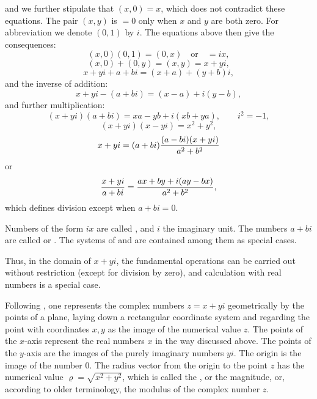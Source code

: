 \begingroup
\setlength{\abovedisplayskip}{5pt plus 2pt minus 1pt}
\setlength{\belowdisplayskip}{5pt plus 2pt minus 1pt}
\setlength{\abovedisplayshortskip}{3pt plus 1pt}
\setlength{\belowdisplayshortskip}{4pt plus 1pt}
and we further stipulate that $(x,0)=x$, which does not contradict
these equations. The pair $(x,y)$ is $=0$ only when $x$ and $y$
are both zero. For abbreviation we denote $(0,1)$ by $i$. The
equations above then give the consequences:
\[
 (x,0)(0,1)=(0,x)\quad\text{or}\quad =ix,
\]
\[
 (x,0)+(0,y)=(x,y)=x+yi,
\]
\[
 x+yi+a+bi=(x+a)+(y+b)i,
\]
and the inverse of addition:
\[
 x+yi-(a+bi)=(x-a)+i(y-b),
\]
and further multiplication:
\[
 (x+yi)(a+bi)=xa-yb+i(xb+ya),
 \qquad i^2=-1,
\]
\[
 (x+yi)(x-yi)=x^2+y^2,
\]
\[
 x+yi=(a+bi){(a-bi)(x+yi)\over a^2+b^2}
\]
or
\[
 {x+yi\over a+bi}={ax+by+i(ay-bx)\over a^2+b^2},
\]
which defines division except when $a+bi=0$.

Numbers of the form $ix$ are called , and $i$ the imaginary unit. The numbers $a+bi$ are called
 or . The systems of
 and  are contained
among them as special cases.

Thus, in the domain of  $x+yi$, the
fundamental operations can be carried out without restriction (except
for division by zero), and calculation with real numbers is a special
case.

Following , one represents the complex numbers
$z=x+yi$ geometrically by the points of a plane, laying down a
rectangular coordinate system and regarding the point with coordinates
$x,y$ as the image of the numerical value $z$. The points of the
$x$-axis represent the real numbers $x$ in the way discussed above.
The points of the $y$-axis are the images of the purely imaginary
numbers $yi$. The origin is the image of the number $0$. The radius
vector from the origin to the point $z$ has the numerical value
$\varrho=\sqrt{x^2+y^2}$, which is called the , or the magnitude, or, according to older terminology, the
modulus of the complex number $z$.
\endgroup
